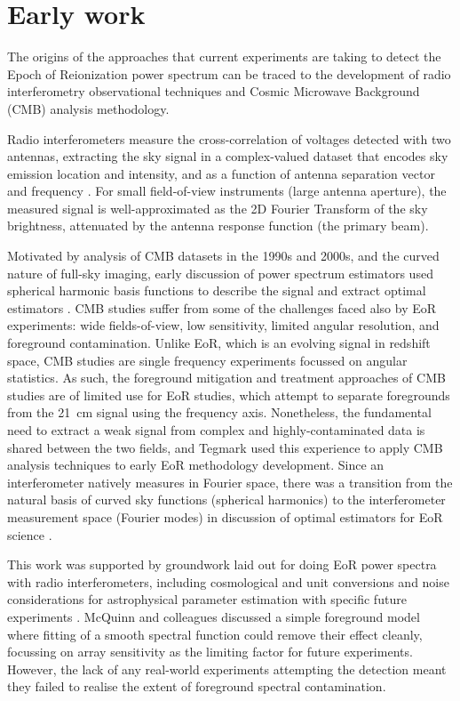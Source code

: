 \section{Early work}
\label{sec:early_work}
The origins of the approaches that current experiments are taking to detect the Epoch of Reionization power spectrum can be traced to the development of radio interferometry observational techniques and Cosmic Microwave Background (CMB) analysis methodology.

Radio interferometers measure the cross-correlation of voltages detected with two antennas, extracting the sky signal in a complex-valued dataset that encodes sky emission location and intensity, and as a function of antenna separation vector and frequency \cite{tms}. For small field-of-view instruments (large antenna aperture), the measured signal is well-approximated as the 2D Fourier Transform of the sky brightness, attenuated by the antenna response function (the primary beam).

Motivated by analysis of CMB datasets in the 1990s and 2000s, and the curved nature of full-sky imaging, early discussion of power spectrum estimators used spherical harmonic basis functions to describe the signal and extract optimal estimators \cite{tegmark97}. CMB studies suffer from some of the challenges faced also by EoR experiments: wide fields-of-view, low sensitivity, limited angular resolution, and foreground contamination. Unlike EoR, which is an evolving signal in redshift space, CMB studies are single frequency experiments focussed on angular statistics. As such, the foreground mitigation and treatment approaches of CMB studies are of limited use for EoR studies, which attempt to separate foregrounds from the 21~cm signal using the frequency axis. Nonetheless, the fundamental need to extract a weak signal from complex and highly-contaminated data is shared between the two fields, and Tegmark \cite{tegmark97} used this experience to apply CMB analysis techniques to early EoR methodology development.
Since an interferometer natively measures in Fourier space, there was a transition from the natural basis of curved sky functions (spherical harmonics) to the interferometer measurement space (Fourier modes) in discussion of optimal estimators for EoR science \cite{liu11}.

This work was supported by groundwork laid out for doing EoR power spectra with radio interferometers, including cosmological and unit conversions \cite{morales04,parsons10} and noise considerations for astrophysical parameter estimation with specific future experiments \cite{mcquinn06}. McQuinn and colleagues \cite{mcquinn06} discussed a simple foreground model where fitting of a smooth spectral function could remove their effect cleanly, focussing on array sensitivity as the limiting factor for future experiments.
However, the lack of any real-world experiments attempting the detection meant they failed to realise the extent of foreground spectral contamination.

